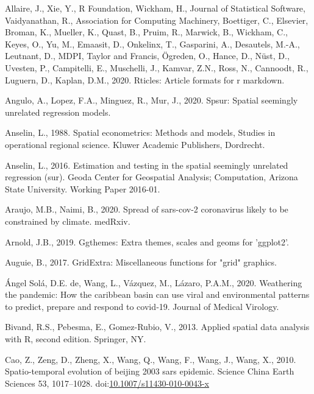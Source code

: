 \documentclass[]{elsarticle} %
\begin{document}
\hypertarget{refs}{}
\leavevmode\hypertarget{ref-Allaire2020}{}%
Allaire, J., Xie, Y., R Foundation, Wickham, H., Journal of Statistical
Software, Vaidyanathan, R., Association for Computing Machinery,
Boettiger, C., Elsevier, Broman, K., Mueller, K., Quast, B., Pruim, R.,
Marwick, B., Wickham, C., Keyes, O., Yu, M., Emaasit, D., Onkelinx, T.,
Gasparini, A., Desautels, M.-A., Leutnant, D., MDPI, Taylor and Francis,
Ögreden, O., Hance, D., Nüst, D., Uvesten, P., Campitelli, E.,
Muschelli, J., Kamvar, Z.N., Ross, N., Cannoodt, R., Luguern, D.,
Kaplan, D.M., 2020. Rticles: Article formats for r markdown.

\leavevmode\hypertarget{ref-Angulo2020spsur}{}%
Angulo, A., Lopez, F.A., Minguez, R., Mur, J., 2020. Spsur: Spatial
seemingly unrelated regression models.

\leavevmode\hypertarget{ref-Anselin1988spatial}{}%
Anselin, L., 1988. Spatial econometrics: Methods and models, Studies in
operational regional science. Kluwer Academic Publishers, Dordrecht.

\leavevmode\hypertarget{ref-Anselin2016estimation}{}%
Anselin, L., 2016. Estimation and testing in the spatial seemingly
unrelated regression (sur). Geoda Center for Geospatial Analysis;
Computation, Arizona State University. Working Paper 2016-01.

\leavevmode\hypertarget{ref-Araujo2020spread}{}%
Araujo, M.B., Naimi, B., 2020. Spread of sars-cov-2 coronavirus likely
to be constrained by climate. medRxiv.

\leavevmode\hypertarget{ref-Arnold2019}{}%
Arnold, J.B., 2019. Ggthemes: Extra themes, scales and geoms for
'ggplot2'.

\leavevmode\hypertarget{ref-Auguie2017gridextra}{}%
Auguie, B., 2017. GridExtra: Miscellaneous functions for "grid"
graphics.

\leavevmode\hypertarget{ref-deangel2020weathering}{}%
Ángel Solá, D.E. de, Wang, L., Vázquez, M., Lázaro, P.A.M., 2020.
Weathering the pandemic: How the caribbean basin can use viral and
environmental patterns to predict, prepare and respond to covid‐19.
Journal of Medical Virology.

\leavevmode\hypertarget{ref-Bivand2013}{}%
Bivand, R.S., Pebesma, E., Gomez-Rubio, V., 2013. Applied spatial data
analysis with R, second edition. Springer, NY.

\leavevmode\hypertarget{ref-Cao2010spatio}{}%
Cao, Z., Zeng, D., Zheng, X., Wang, Q., Wang, F., Wang, J., Wang, X.,
2010. Spatio-temporal evolution of beijing 2003 sars epidemic. Science
China Earth Sciences 53, 1017--1028.
doi:\href{https://doi.org/10.1007/s11430-010-0043-x}{10.1007/s11430-010-0043-x}
\end{document}
